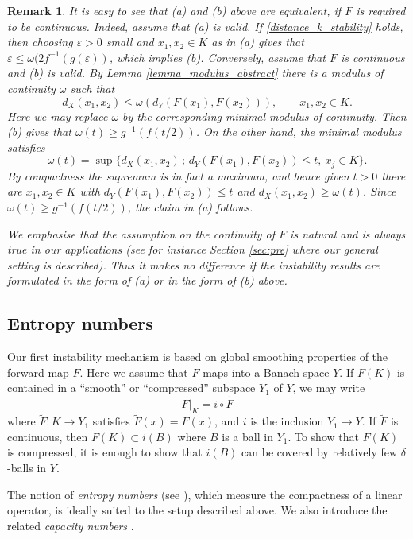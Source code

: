 \documentclass[12pt,twoside]{amsart}
\numberwithin{equation}{section}
\renewcommand{\leq}{\leqslant}
\renewcommand{\geq}{\geqslant}
\newtheorem{remark}[theorem]{Remark}
\newcommand{\eps}{\varepsilon}
\begin{document}
\begin{remark}
\label{rmk:equiv_Mandache}
It is easy to see that (a) and (b) above are equivalent, if $F$ is required to be continuous. Indeed, assume that (a) is valid. If \eqref{distance_k_stability} holds, then choosing $\eps > 0$ small and $x_1, x_2 \in K$ as in (a) gives that $\eps \leq \omega(2 f^{-1}(g(\eps))$, which implies (b). Conversely, assume that $F$ is continuous and (b) is valid. By Lemma \ref{lemma_modulus_abstract} there is a modulus of continuity $\omega$ such that 
\[
d_X(x_1, x_2) \leq \omega(d_Y(F(x_1), F(x_2))), \qquad x_1, x_2 \in K.
\]
Here we may replace $\omega$ by the corresponding minimal modulus of continuity. Then (b) gives that $\omega(t) \geq g^{-1}(f(t/2))$. On the other hand, the minimal modulus satisfies 
\[
\omega(t) = \sup \{ d_X(x_1, x_2) \,;\, d_Y(F(x_1), F(x_2)) \leq t, \ x_j \in K \}.
\]
By compactness the supremum is in fact a maximum, and hence given $t > 0$ there are $x_1, x_2 \in K$ with $d_Y(F(x_1), F(x_2)) \leq t$ and $d_X(x_1, x_2) \geq \omega(t)$. Since $\omega(t) \geq g^{-1}(f(t/2))$, the claim in (a) follows.


We emphasise that the assumption on the continuity of $F$ is natural and is always true in our applications (see for instance Section \ref{sec:pre} where our general setting is described). Thus it makes no difference if the instability results are formulated in the form of (a) or in the form of (b) above.
\end{remark}



\subsection{Entropy numbers}

Our first instability mechanism is based on global smoothing properties of the forward map $F$. Here we assume that $F$ maps into a Banach space $Y$. If $F(K)$ is contained in a ``smooth'' or ``compressed'' subspace $Y_1$ of $Y$, we may write 
\[
F|_K = i \circ \tilde{F}
\]
where $\tilde{F}: K \to Y_1$ satisfies $\tilde{F}(x) = F(x)$, and $i$ is the inclusion $Y_1 \to Y$. If $\tilde{F}$ is continuous, then $F(K) \subset i(B)$ where $B$ is a ball in $Y_1$. To show that $F(K)$ is compressed, it is enough to show that $i(B)$ can be covered by relatively few $\delta$-balls in $Y$.

The notion of \emph{entropy numbers} (see \cite{CS90, ET08}), which measure the compactness of a linear operator, is ideally suited to the setup described above. We also introduce the related \emph{capacity numbers} \cite{CS90}.
\end{document}
